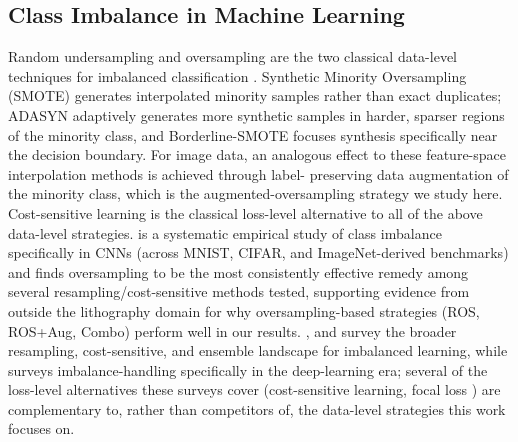 \documentclass[conference]{IEEEtran}
\begin{document}
\subsection{Class Imbalance in Machine Learning}
Random undersampling and oversampling are the two classical data-level
techniques for imbalanced classification \cite{he2009imbalanced}.
Synthetic Minority Oversampling (SMOTE) \cite{chawla2002smote}
generates interpolated minority samples rather than exact duplicates;
ADASYN \cite{he2008adasyn} adaptively generates more synthetic samples
in harder, sparser regions of the minority class, and Borderline-SMOTE
\cite{han2005borderline} focuses synthesis specifically near the
decision boundary. For image data, an analogous effect to these
feature-space interpolation methods is achieved through label-
preserving data augmentation of the minority class, which is the
augmented-oversampling strategy we study here. Cost-sensitive learning
\cite{elkan2001costsensitive} is the classical loss-level alternative
to all of the above data-level strategies. \cite{buda2018systematic}
is a systematic empirical study of class imbalance specifically in
CNNs (across MNIST, CIFAR, and ImageNet-derived benchmarks) and finds
oversampling to be the most consistently effective remedy among
several resampling/cost-sensitive methods tested, supporting evidence
from outside the lithography domain for why
oversampling-based strategies (ROS, ROS+Aug, Combo) perform well in
our results. \cite{he2009imbalanced}, \cite{krawczyk2016challenges} and
\cite{branco2016survey} survey the broader resampling, cost-sensitive,
and ensemble landscape for imbalanced learning, while
\cite{johnson2019survey} surveys imbalance-handling specifically in
the deep-learning era; several of the loss-level alternatives these
surveys cover (cost-sensitive learning, focal loss
\cite{lin2017focal}) are complementary to, rather than competitors of,
the data-level strategies this work focuses on.
\end{document}
